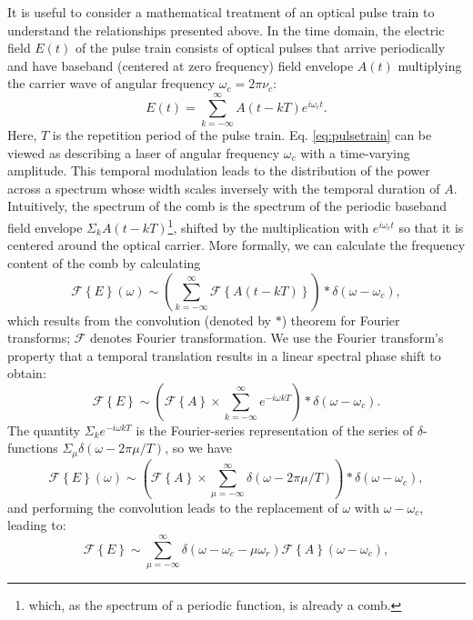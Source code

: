 It is useful to consider a mathematical treatment of an optical pulse train to understand the relationships presented above. In the time domain, the electric field $E(t)$ of the pulse train consists of optical pulses that arrive periodically and have baseband (centered at zero frequency) field envelope $A(t)$ multiplying the carrier wave of angular frequency $\omega_c=2\pi\nu_c$:
\begin{equation}
E(t)=\sum_{k=-\infty}^{\infty} A(t-kT)e^{i\omega_c t}. \label{eq:pulsetrain}
\end{equation}
Here, $T$ is the repetition period of the pulse train. Eq. \ref{eq:pulsetrain} can be viewed as describing a laser of angular frequency $\omega_c$ with a time-varying amplitude. This temporal modulation leads to the distribution of the power across a spectrum whose width scales inversely with the temporal duration of $A$. Intuitively, the spectrum of the comb is the spectrum of the periodic baseband field envelope $\Sigma_k A(t-kT)$\footnote{which, as the spectrum of a periodic function, is already a comb.}, shifted by the multiplication with $e^{i\omega_c t}$ so that it is centered around the optical carrier. More formally, we can calculate the frequency content of the comb by calculating
\begin{equation}
\mathcal{F}\left\{E\right\}(\omega)\sim\left(\sum_{k=-\infty}^{\infty}\mathcal{F}\left\{A(t-kT)\right\}\right)*\delta(\omega-\omega_c),
\end{equation}
which results from the convolution (denoted by $*$) theorem for Fourier transforms; $\mathcal{F}$ denotes Fourier transformation. We use the Fourier transform's property that a temporal translation results in a linear spectral phase shift to obtain:
\begin{equation}
\mathcal{F}\left\{E\right\}\sim\left(\mathcal{F}\left\{A\right\}\times\sum_{k=-\infty}^{\infty}e^{-i\omega kT}\right)*\delta(\omega-\omega_c).
\end{equation}
The quantity $\Sigma_ke^{-i\omega kT}$ is the Fourier-series representation of the series of $\delta$-functions \mbox{$\Sigma_\mu\delta(\omega-2\pi\mu/T)$}, so we have
\begin{equation}
\mathcal{F}\left\{E\right\}(\omega)\sim\left(\mathcal{F}\left\{A\right\}\times\sum_{\mu=-\infty}^{\infty}\delta\left(\omega-2\pi \mu/T\right)\right)*\delta(\omega-\omega_c),
\end{equation}
and performing the convolution leads to the replacement of $\omega$ with $\omega-\omega_c$, leading to:
\begin{equation}
\mathcal{F}\left\{E\right\}\sim\sum_{\mu=-\infty}^{\infty}\delta\left(\omega-\omega_c-\mu\omega_r\right)\mathcal{F}\left\{A\right\}(\omega-\omega_c), \label{eq:combspectrum}
\end{equation}
